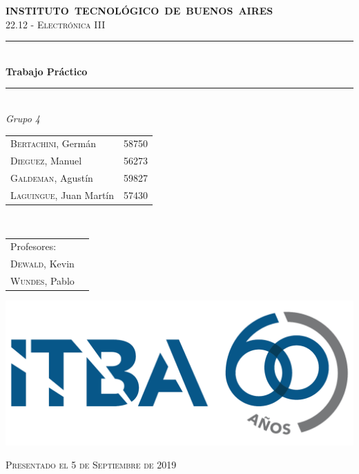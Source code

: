 \begin{titlepage}
    \newcommand{\HRule}{\rule{\linewidth}{0.5mm}}
    \begin{center}
	    \mbox{\textsc{\large \bfseries {INSTITUTO TECNOL\'OGICO DE BUENOS AIRES}}} \\[1cm]
	    \textsc{\Large 22.12 - Electr\'onica III} \\[0.5cm]    
	    \HRule \\[0.6cm]
	    { 	\Huge \bfseries Trabajo Pr\'actico 	} \\[0.4cm] 
	    \HRule \\[1.5cm]
	    \large
	    \emph{\Large Grupo 4}\\
	    \vspace{10px}
	   
	    \begin{tabular}{lr}
	    \textsc{Bertachini}, Germ\'an  & 58750 \\ 	
	    \textsc{Dieguez}, Manuel  & 56273 \\
	    \textsc{Galdeman}, Agust\'in  & 59827 \\
	    \textsc{Laguingue}, Juan Mart\'in  & 57430 \\
	    \end{tabular} \\
	    \vspace{20px}
	    \begin{tabular}{lr}
	    \textsc{}Profesores:\\
	    \textsc{Dewald}, Kevin\\
	    \textsc{Wundes}, Pablo\\
	    \end{tabular}
	    \vspace{60px}
	
		\includegraphics[scale=0.20]{Extras/ITBA.png}    
		\vspace{30px}
	    
	    \textsc{\large Presentado el 5 de Septiembre de 2019}\\
    \end{center}
\end{titlepage}
